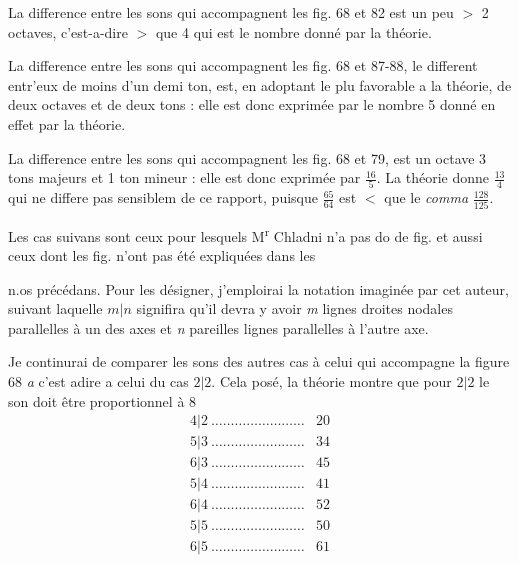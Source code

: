 \documentclass[11pt,a4paper]{article}
\begin{document}
La difference entre les sons qui accompagnent les fig. 68 et 82 est un peu $>$
2 octaves, c'est-a-dire $>$ que 4 qui est le nombre donné par la théorie.

La difference entre les sons qui accompagnent les fig. 68 et 87-88, le
different entr'eux de moins d'un demi ton, est, en adoptant le plu
favorable a la théorie, de deux octaves et de deux tons : elle est donc
exprimée par le nombre 5 donné en effet par la théorie.

La difference entre les sons qui accompagnent les fig. 68 et 79,
est un octave 3 tons majeurs et 1 ton mineur : elle est donc
exprimée par $\frac{16}{5}$. La théorie donne $\frac{13}{4}$ qui ne differe pas sensiblem
de ce rapport, puisque $\frac{65}{64}$ est $<$ que le \emph{comma} $\frac{128}{125}$.

Les cas suivans sont ceux pour lesquels M\textsuperscript{r} Chladni n'a pas do
de fig. et aussi ceux dont les fig. n'ont pas été expliquées dans les


n.os précédans. Pour les désigner, j'emploirai la notation imaginée par cet auteur,
suivant laquelle $m|n$ signifira qu'il devra y avoir \emph{m} lignes droites nodales
parallelles à un des axes et \emph{n} pareilles lignes parallelles à l'autre axe.

Je continurai de comparer les sons des autres cas à celui qui accompagne
la figure 68 \emph{a} c'est adire a celui du cas $2|2$. Cela posé, la théorie montre
que pour $2|2$ le son doit être proportionnel à 8
\[
\begin{array}{lr}
4|2\ \ldots\ldots\ldots\ldots\ldots\ldots\ldots\ldots & 20\\
5|3\ \ldots\ldots\ldots\ldots\ldots\ldots\ldots\ldots & 34\\
6|3\ \ldots\ldots\ldots\ldots\ldots\ldots\ldots\ldots & 45\\
5|4\ \ldots\ldots\ldots\ldots\ldots\ldots\ldots\ldots & 41\\
6|4\ \ldots\ldots\ldots\ldots\ldots\ldots\ldots\ldots & 52\\
5|5\ \ldots\ldots\ldots\ldots\ldots\ldots\ldots\ldots & 50\\
6|5\ \ldots\ldots\ldots\ldots\ldots\ldots\ldots\ldots & 61
\end{array}
\]
\end{document}
